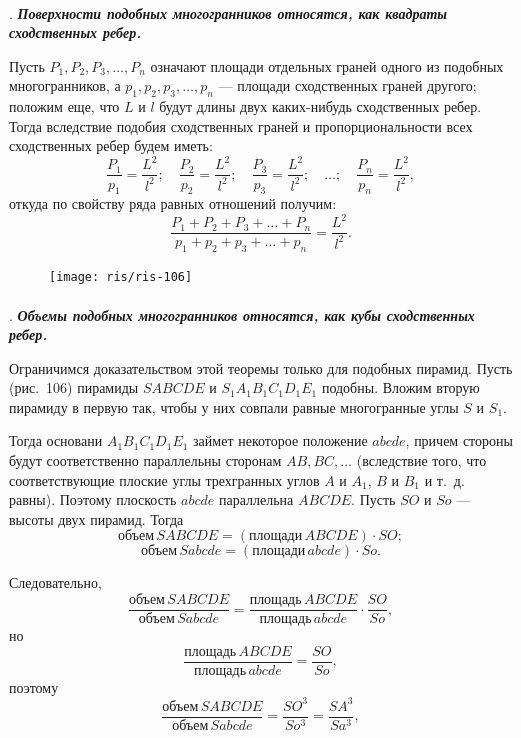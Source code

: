 \documentclass[twoside]{book}
\begin{document}
\paragraph{}\label{1938/s95}
.
\textbf{\emph{Поверхности подобных многогранников относятся, как квадраты сходственных ребер.}}

Пусть $P_1, P_2, P_3,\dots,P_n$ означают площади отдельных граней одного из подобных многогранников, а $p_1, p_2, p_3,\dots,p_n$ --- площади сходственных граней другого;
положим еще, что $L$ и $l$ будут длины двух каких-нибудь сходственных ребер.
Тогда вследствие подобия сходственных граней и пропорциональности всех сходственных ребер будем иметь:
\[
\frac{P_1}{p_1}=\frac{L^2}{l^2};
\quad 
\frac{P_2}{p_2}=\frac{L^2}{l^2};
\quad
\frac{P_3}{p_3}=\frac{L^2}{l^2};
\quad
\dots;
\quad
\frac{P_n}{p_n}=\frac{L^2}{l^2},
\] %
откуда по свойству ряда равных отношений получим:
\[
\frac{P_1+P_2+P_3+\dots+P_n}{p_1+p_2+p_3+\dots+p_n}=\frac{L^2}{l^2}.
\]

\begin{figure}[h!]
\centering
\texttt{[image: ris/ris-106]}
\caption{}
\end{figure}

\paragraph{}\label{1938/s96}
.
\textbf{\emph{Объемы подобных многогранников относятся, как кубы сходственных ребер.}}

Ограничимся доказательством этой теоремы только для подобных пирамид. %
Пусть (рис.~106) пирамиды $SABCDE$ и $S_1A_1B_1C_1D_1E_1$ подобны.
Вложим вторую пирамиду в первую так, чтобы у них совпали равные многогранные углы $S$ и $S_1$.

Тогда основани $A_1B_1C_1D_1E_1$ займет некоторое положение $abcde$, причем стороны будут соответственно параллельны сторонам $AB, BC,\dots$ (вследствие того, что соответствующие плоские углы трехгранных углов $A$ и $A_1$, $B$ и $B_1$ и т.~д. равны).
Поэтому плоскость $abcde$ параллельна $ABCDE$.
Пусть $SO$ и $So$ --- высоты двух пирамид.
Тогда 
\[\text{объем}\,SABCDE = (\text{площади}\,ABCDE)\cdot SO;\]
\[\text{объем}\,Sabcde = (\text{площади}\,abcde)\cdot So.\]

Следовательно,
\[\frac{\text{объем}\, SABCDE}{\text{объем}\, Sabcde} 
= \frac{\text{площадь}\, ABCDE}{\text{площадь}\, abcde}\cdot\frac{SO}{So},
\]
но
\[\frac{\text{площадь}\, ABCDE}{\text{площадь}\, abcde}=\frac{SO}{So},
\]
поэтому
\[\frac{\text{объем}\, SABCDE}{\text{объем}\, Sabcde} 
= \frac{SO^3}{So^3}=\frac{SA^3}{Sa^3},
\] %
\end{document}
